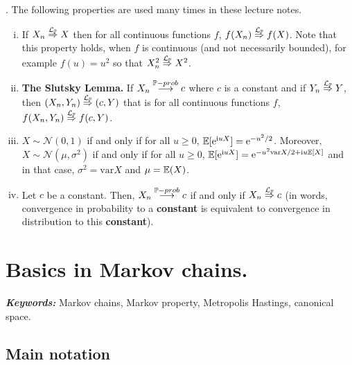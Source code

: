 \documentclass[english,graybox,envcountchap,envcountsame,sectrefs,shortlabels]{svmono}
\theoremstyle{style}
\renewenvironment{keywords}{\textit{\bf Keywords: } \sffamily }{}
\newcommand{\weaklim}{\ensuremath{\stackrel{\mathcal{L}_{\PP}}{\Rightarrow}}}
\newcommand{\rme}{\mathrm{e}}
\newcommand{\rmi}{\mathrm{i}}
\newcommand{\plim}[1]{\stackrel{#1-prob}{\longrightarrow}}
\newcommand{\gauss}{\mathcal{N}}
\begin{document}
.
\newcommand{\var}{\mathrm{var}}
The following properties are used many times in these lecture notes.
\begin{enumerate}[(i)]
\item If $X_n \weaklim X$ then for all continuous functions $f$, $f(X_n) \weaklim f(X)$. Note that this property  holds, when $f$ is continuous (and not necessarily bounded), for example $f(u)=u^2$ so that $X_n^2 \weaklim X^2$.
\item \textbf{The Slutsky Lemma.} If $X_n \plim{\PP} c$ where $c$ is a constant and if $Y_n \weaklim Y$, then $(X_n,Y_n) \weaklim (c,Y)$ that is for all continuous functions $f$, $f(X_n,Y_n) \weaklim f(c,Y)$.
\item $X \sim \gauss(0,1)$ if and only if for all $u \geq 0$, $\PE[\rme^{\rmi u
    X}]=\rme^{-u^2/2}$. Moreover, $X \sim \gauss(\mu,\sigma^2)$ if and only if
  for all $u \geq 0$, $\PE[\rme^{\rmi u X}]=\rme^{-u^2 \var{X}/2+\rmi
    u \PE[X]}$ and in that case, $\sigma^2=\var{X}$ and $\mu=\mathbb{E}(X)$.
 \item Let $c$ be a constant. Then, $X_n \plim{\PP} c$ if and only if $X_n \weaklim c$ (in words, convergence
   in probability to a {\bf constant} is equivalent to convergence in
   distribution to this {\bf constant}).
\end{enumerate}



\dominitoc
\tableofcontents

\chapter{Basics in Markov chains.}
\minitoc
\begin{keywords}
Markov chains, Markov property, Metropolis Hastings, canonical space.
\end{keywords}


\section{Main notation}
\end{document}
